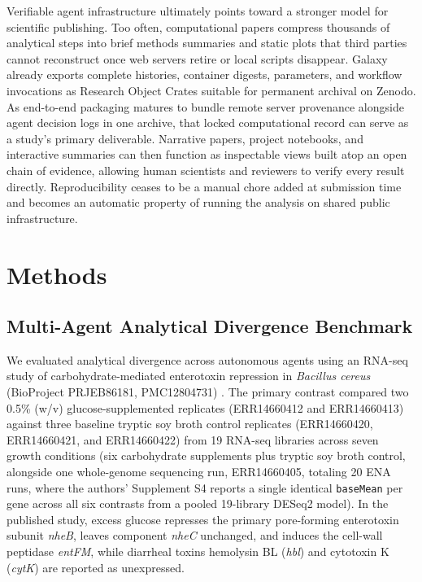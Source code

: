 \documentclass[11pt,letterpaper]{article}
\newcommand{\tool}[1]{\textsf{#1}}
\begin{document}
Verifiable agent infrastructure ultimately points toward a stronger model for scientific publishing. Too often, computational papers compress thousands of analytical steps into brief methods summaries and static plots that third parties cannot reconstruct once web servers retire or local scripts disappear. Galaxy already exports complete histories, container digests, parameters, and workflow invocations as Research Object Crates suitable for permanent archival on Zenodo. As end-to-end packaging matures to bundle remote server provenance alongside agent decision logs in one archive, that locked computational record can serve as a study's primary deliverable. Narrative papers, project notebooks, and interactive summaries can then function as inspectable views built atop an open chain of evidence, allowing human scientists and reviewers to verify every result directly. Reproducibility ceases to be a manual chore added at submission time and becomes an automatic property of running the analysis on shared public infrastructure.

\section*{Methods}

\subsection*{Multi-Agent Analytical Divergence Benchmark}
We evaluated analytical divergence across autonomous agents using an RNA-seq study of carbohydrate-mediated enterotoxin repression in \textit{Bacillus cereus} (BioProject PRJEB86181, PMC12804731) \cite{vyklicka2026}. The primary contrast compared two 0.5\% (w/v) glucose-supplemented replicates (ERR14660412 and ERR14660413) against three baseline tryptic soy broth control replicates (ERR14660420, ERR14660421, and ERR14660422) from 19 RNA-seq libraries across seven growth conditions (six carbohydrate supplements plus tryptic soy broth control, alongside one whole-genome sequencing run, ERR14660405, totaling 20 ENA runs, where the authors' Supplement S4 reports a single identical \texttt{baseMean} per gene across all six contrasts from a pooled 19-library \tool{DESeq2} model). In the published study, excess glucose represses the primary pore-forming enterotoxin subunit \textit{nheB}, leaves component \textit{nheC} unchanged, and induces the cell-wall peptidase \textit{entFM}, while diarrheal toxins hemolysin BL (\textit{hbl}) and cytotoxin K (\textit{cytK}) are reported as unexpressed.
\end{document}
